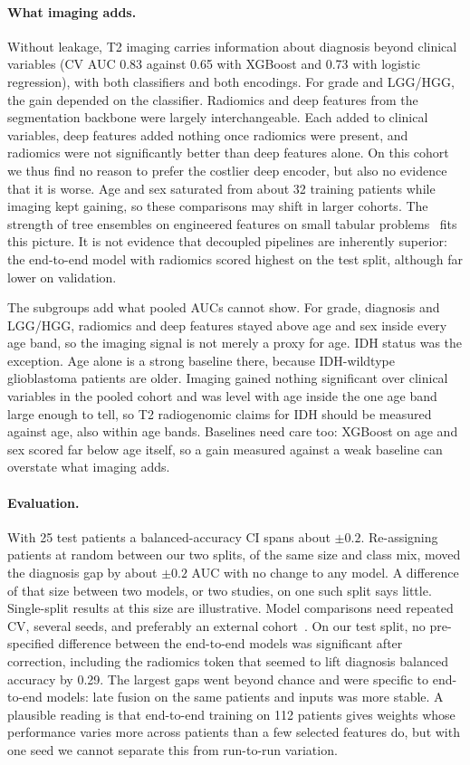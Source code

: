 \documentclass[11pt]{article}
\begin{document}
\paragraph{What imaging adds.} Without leakage, T2 imaging carries information about diagnosis beyond clinical
variables (CV AUC 0.83 against 0.65 with XGBoost and 0.73 with logistic regression), with both classifiers and both
encodings. For grade and LGG/HGG, the gain depended on the classifier. Radiomics and deep features from the segmentation backbone were largely interchangeable.
Each added to clinical variables, deep features added nothing once radiomics were present, and radiomics were not
significantly better than deep features alone. On this cohort we thus find no reason to prefer the costlier deep
encoder, but also no evidence that it is worse. Age and sex saturated from about 32 training patients while imaging kept
gaining, so these comparisons may shift in larger cohorts. The strength of tree ensembles on engineered features on small tabular
problems~\cite{grinsztajn2022tree} fits this picture. It is not evidence that decoupled pipelines are inherently
superior: the end-to-end model with radiomics scored highest on the test split, although far lower on validation.

The subgroups add what pooled AUCs cannot show. For grade, diagnosis and LGG/HGG, radiomics and deep features stayed
above age and sex inside every age band, so the imaging signal is not merely a proxy for age. IDH status was the
exception. Age alone is a strong baseline there, because IDH-wildtype glioblastoma patients are older. Imaging gained
nothing significant over clinical variables in the pooled cohort and was level with age inside the one age band large
enough to tell, so T2 radiogenomic claims for IDH should be measured against age, also within age bands. Baselines need
care too: XGBoost on age and sex scored far below age itself, so a gain measured against a weak baseline can overstate
what imaging adds.

\paragraph{Evaluation.} With 25 test patients a balanced-accuracy CI spans about $\pm 0.2$. Re-assigning patients at
random between our two splits, of the same size and class mix, moved the diagnosis gap by about $\pm 0.2$ AUC with no
change to any model. A difference of that size between two models, or two studies, on one such split says little.
Single-split results at this size are illustrative. Model comparisons need repeated CV, several seeds, and preferably
an external cohort~\cite{varoquaux2018cv,varoquaux2022failures}. On our test split, no pre-specified difference between
the end-to-end models was significant after correction, including the radiomics token that seemed to lift diagnosis
balanced accuracy by 0.29. The largest gaps went beyond chance and were specific to end-to-end models: late fusion on
the same patients and inputs was more stable. A plausible reading is that end-to-end training on 112 patients gives
weights whose performance varies more across patients than a few selected features do, but with one seed we cannot
separate this from run-to-run variation.
\end{document}
